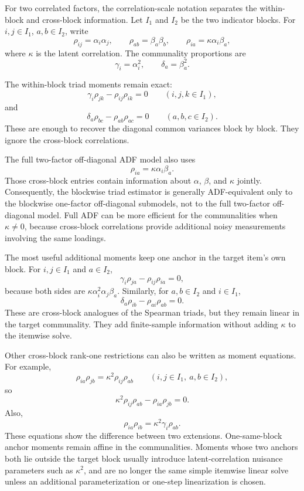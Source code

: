 \documentclass[11pt]{article}
\theoremstyle{plain}
\theoremstyle{remark}
\begin{document}
For two correlated factors, the correlation-scale notation separates the
within-block and cross-block information. Let \(I_1\) and \(I_2\) be the two
indicator blocks. For \(i,j\in I_1\), \(a,b\in I_2\), write
\[
  \rho_{ij}=\alpha_i\alpha_j,
  \qquad
  \rho_{ab}=\beta_a\beta_b,
  \qquad
  \rho_{ia}=\kappa\alpha_i\beta_a ,
\]
where \(\kappa\) is the latent correlation. The communality proportions are
\[
  \gamma_i=\alpha_i^2,
  \qquad
  \delta_a=\beta_a^2 .
\]

The within-block triad moments remain exact:
\[
  \gamma_i\rho_{jk}-\rho_{ij}\rho_{ik}=0
  \qquad(i,j,k\in I_1),
\]
and
\[
  \delta_a\rho_{bc}-\rho_{ab}\rho_{ac}=0
  \qquad(a,b,c\in I_2).
\]
These are enough to recover the diagonal common variances block by block. They
ignore the cross-block correlations.

The full two-factor off-diagonal ADF model also uses
\[
  \rho_{ia}=\kappa\alpha_i\beta_a .
\]
Those cross-block entries contain information about \(\alpha\), \(\beta\), and
\(\kappa\) jointly. Consequently, the blockwise triad estimator is generally
ADF-equivalent only to the blockwise one-factor off-diagonal submodels, not to
the full two-factor off-diagonal model. Full ADF can be more efficient for the
communalities when \(\kappa\ne0\), because cross-block correlations provide
additional noisy measurements involving the same loadings.

The most useful additional moments keep one anchor in the target item's own
block. For \(i,j\in I_1\) and \(a\in I_2\),
\[
  \gamma_i\rho_{ja}-\rho_{ij}\rho_{ia}=0,
\]
because both sides are
\(\kappa\alpha_i^2\alpha_j\beta_a\). Similarly, for \(a,b\in I_2\) and
\(i\in I_1\),
\[
  \delta_a\rho_{ib}-\rho_{ai}\rho_{ab}=0 .
\]
These are cross-block analogues of the Spearman triads, but they remain linear
in the target communality. They add finite-sample information without adding
\(\kappa\) to the itemwise solve.

Other cross-block rank-one restrictions can also be written as moment
equations. For example,
\[
  \rho_{ia}\rho_{jb}
  =
  \kappa^2\rho_{ij}\rho_{ab}
  \qquad
  (i,j\in I_1,\ a,b\in I_2),
\]
so
\[
  \kappa^2\rho_{ij}\rho_{ab}-\rho_{ia}\rho_{jb}=0 .
\]
Also,
\[
  \rho_{ia}\rho_{ib}
  =
  \kappa^2\gamma_i\rho_{ab}.
\]
These equations show the difference between two extensions. One-same-block
anchor moments remain affine in the communalities. Moments whose two anchors
both lie outside the target block usually introduce latent-correlation nuisance
parameters such as \(\kappa^2\), and are no longer the same simple itemwise
linear solve unless an additional parameterization or one-step linearization is
chosen.
\end{document}
